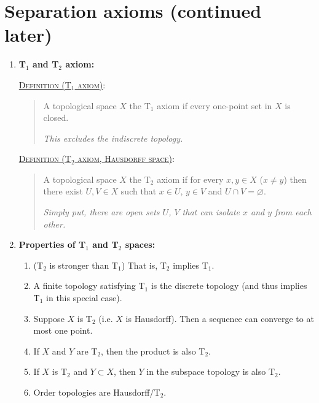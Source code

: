 \documentclass[letterpaper, 12pt]{book}
\newcommand{\Taxiom}[1]{T$_\text{#1}$}
\newcommand{\defn}[2]{\textsc{\underline{Definition (#1)}:}\begin{quote} #2\end{quote}}
\let\emptyset\varnothing
\begin{document}
\section{Separation axioms (continued later)}
    \begin{enumerate}[resume]
    \item \textbf{\Taxiom{1} and \Taxiom{2} axiom:}

        \defn{\Taxiom{1} axiom}{A topological space $X$ the \Taxiom{1} axiom if every one-point set in $X$ is closed.

        \textit{This excludes the indiscrete topology.}}

        \defn{\Taxiom{2} axiom, Hausdorff space}{A topological space $X$ the \Taxiom{2} axiom if for every $x, y\in X$ ($x\ne y$) then there exist $U, V\in X$ such that $x\in U$, $y\in V$ and $U\cap V = \emptyset$.

        \textit{Simply put, there are open sets $U$, $V$ that can isolate $x$ and $y$ from each other.}}
    \item \textbf{Properties of \Taxiom{1} and \Taxiom{2} spaces:}
        \begin{enumerate}
        \item (\Taxiom{2} is stronger than \Taxiom{1}) That is, \Taxiom{2} implies \Taxiom{1}.
        \item A finite topology satisfying \Taxiom{1} is the discrete topology (and thus implies \Taxiom{1} in this special case).
        \item Suppose $X$ is \Taxiom{2} (i.e. $X$ is Hausdorff). Then a sequence can converge to at most one point.
        \item If $X$ and $Y$ are \Taxiom{2}, then the product is also \Taxiom{2}.
        \item If $X$ is \Taxiom{2} and $Y\subset X$, then $Y$ in the subspace topology is also \Taxiom{2}.
        \item Order topologies are Hausdorff/\Taxiom{2}.
        \end{enumerate}
%
\end{enumerate}

\end{document}
